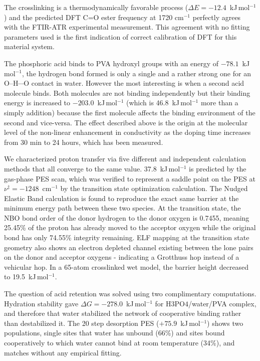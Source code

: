 \documentclass[12pt,a4paper]{report}
\begin{document}
The crosslinking is a thermodynamically favorable process ($\Delta E = -12.4$~kJ\,mol\(^{-1}\)) and the predicted DFT C=O ester frequency at 1720 cm\(^{-1}\) perfectly agrees with the FTIR-ATR experimental measurement. This agreement with no fitting parameters used is the first indication of correct calibration of DFT for this material system.

The phosphoric acid binds to PVA hydroxyl groups with an energy of $-78.1$~kJ\,mol\(^{-1}\), the hydrogen bond formed is only a single and a rather strong one for an O--H$\cdots$O contact in water. However the most interesting is when a second acid molecule binds. Both molecules are not binding independently but their binding energy is increased to $-203.0$~kJ\,mol\(^{-1}\) (which is 46.8~kJ\,mol\(^{-1}\)  more than a simply addition) because the first molecule affects the binding environment of the second and vice-versa. The effect described above is the origin at the molecular level of the non-linear enhancement in conductivity as the doping time increases from 30 min to 24 hours, which has been measured.

We characterized proton transfer via five different and independent calculation methods that all converge to the same value. 37.8~kJ\,mol\(^{-1}\) is predicted by the gas-phase PES scan, which was verified to represent a saddle point on the PES at $\nu^{\ddagger} = -1248$~cm\(^{-1}\) by the transition state optimization calculation. The Nudged Elastic Band calculation is found to reproduce the exact same barrier at the minimum energy path between these two species. At the transition state, the NBO bond order of the donor hydrogen to the donor oxygen is 0.7455, meaning 25.45\% of the proton has already moved to the acceptor oxygen while the original bond has only 74.55\% integrity remaining. ELF mapping at the transition state geometry also shows an electron depleted channel existing between the lone pairs on the donor and acceptor oxygens - indicating a Grotthuss hop instead of a vehicular hop. In a 65-atom crosslinked wet model, the barrier height decreased to 19.5~kJ\,mol\(^{-1}\).

 The question of acid retention was solved using two complimentary computations. Hydration stability gave $\Delta G = -278.0$~kJ\,mol\(^{-1}\) for H\(3\)PO\(4\)/water/PVA complex, and therefore that water stabilized the network of cooperative binding rather than destabilized it. The 20 step desorption PES ($+75.9$~kJ\,mol\(^{-1}\)) shows two populations, single sites that water has unbound (66\%) and sites bound cooperatively to which water cannot bind at room temperature (34\%), and matches without any empirical fitting.
\end{document}
